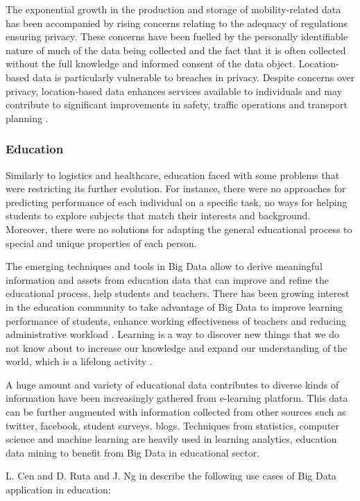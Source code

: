 \documentclass[runningheads]{llncs}
\begin{document}
The exponential growth in the production and storage of mobility-related data has been accompanied by rising concerns relating to the adequacy of regulations ensuring privacy. These concerns have been fuelled by the personally identifiable nature of much of the data being collected and the fact that it is often collected without the full knowledge and informed consent of the data object. Location-based data is particularly vulnerable to breaches in privacy. Despite concerns over privacy, location-based data enhances services available to individuals and may contribute to significant improvements in safety, traffic operations and transport planning \cite{TRANSPORT}. 

\subsubsection{Education}

Similarly to logistics and healthcare, education faced with some problems that were restricting its further evolution. For instance, there were no approaches for predicting performance of each individual on a specific task, no ways for helping students to explore subjects that match their interests and background. Moreover, there were no solutions for adapting the general educational process to special and unique properties of each person. 

The emerging techniques and tools in Big Data allow to derive meaningful information and assets from education data that can improve and refine the educational process, help students and teachers. There has been growing interest in the education community to take advantage of Big Data to improve learning performance of
students, enhance working effectiveness of teachers and reducing administrative workload \cite{SHAMRZO}. Learning is a way to discover new things that we do not know about to increase our knowledge and expand our understanding of the world, which is a lifelong activity \cite{BIGEDUCATION}. 

A huge amount and variety of educational data contributes to diverse kinds of information have been increasingly gathered from e-learning platform. This data can be further augmented with information collected from other sources such as twitter, facebook, student surveys, blogs. Techniques from statistics, computer science and machine learning are heavily used in learning analytics, education data mining to benefit from Big Data in educational sector.

L. Cen and D. Ruta and J. Ng in \cite{EDUCATIONOPPORTUNITIES} describe the following use cases of Big Data application in education:
\end{document}
